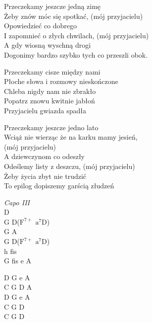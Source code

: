 \begin{text}
    \chordfill
    Przeczekamy jeszcze jedną zimę\\
    Żeby znów móc się spotkać, (mój przyjacielu)\\
    Opowiedzieć co dobrego\\
    I zapomnieć o złych chwilach, (mój przyjacielu)\\
    A gdy wiosną wyschną drogi\\
    Dogonimy bardzo szybko tych co przeszli obok.

    Przeczekamy cisze między nami\\
    Płoche słowa i rozmowy nieskończone\\
    Chleba nigdy nam nie zbrakło\\
    Popatrz znowu kwitnie jabłoń\\
    Przyjacielu gwiazda spadła

    Przeczekamy jeszcze jedno lato\\
    Wciąż nie wierząc że na karku mamy jesień,\\
    (mój przyjacielu)\\
    A dziewczynom co odeszły\\
    Odeślemy listy z deszczu, (mój przyjacielu)\\
    Żeby życia zbyt nie trudzić\\
    To epilog dopiszemy garścią złudzeń
\end{text}
\begin{chord}
    \textit{Capo III}\\
    D\\
    G D($\mathrm{F^{7+}}$ $\mathrm{a^{7}}$D)\\
    G A\\
    G D($\mathrm{F^{7+}}$ $\mathrm{a^{7}}$D)\\
    h fis\\
    G fis e A

    D G e A\\
    C G D A\\
    D G e A\\
    C G D\\
    C G D
\end{chord}
